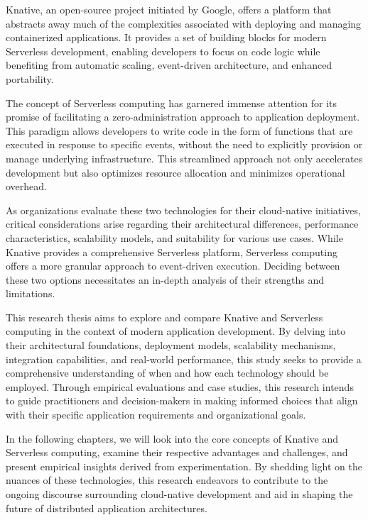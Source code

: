 \documentclass{article}
\begin{document}
Knative, an open-source project initiated by Google, offers a platform that abstracts away much of the complexities associated with deploying and managing containerized applications. It provides a set of building blocks for modern Serverless development, enabling developers to focus on code logic while benefiting from automatic scaling, event-driven architecture, and enhanced portability.

The concept of Serverless computing has garnered immense attention for its promise of facilitating a zero-administration approach to application deployment. This paradigm allows developers to write code in the form of functions that are executed in response to specific events, without the need to explicitly provision or manage underlying infrastructure. This streamlined approach not only accelerates development but also optimizes resource allocation and minimizes operational overhead.

As organizations evaluate these two technologies for their cloud-native initiatives, critical considerations arise regarding their architectural differences, performance characteristics, scalability models, and suitability for various use cases. While Knative provides a comprehensive Serverless platform, Serverless computing offers a more granular approach to event-driven execution. Deciding between these two options necessitates an in-depth analysis of their strengths and limitations.

This research thesis aims to explore and compare Knative and Serverless computing in the context of modern application development. By delving into their architectural foundations, deployment models, scalability mechanisms, integration capabilities, and real-world performance, this study seeks to provide a comprehensive understanding of when and how each technology should be employed. Through empirical evaluations and case studies, this research intends to guide practitioners and decision-makers in making informed choices that align with their specific application requirements and organizational goals.

In the following chapters, we will look into the core concepts of Knative and Serverless computing, examine their respective advantages and challenges, and present empirical insights derived from experimentation. By shedding light on the nuances of these technologies, this research endeavors to contribute to the ongoing discourse surrounding cloud-native development and aid in shaping the future of distributed application architectures.
\pagebreak
\end{document}
